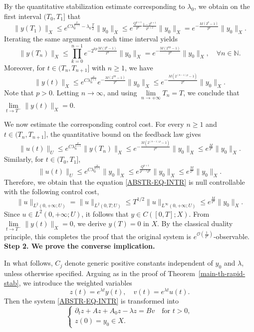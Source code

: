 \documentclass[a4paper]{article}
\numberwithin{equation}{section}
\begin{document}
By the quantitative stabilization estimate corresponding to $\lambda_0$, 
we obtain on the first interval $(T_0,T_1]$ that
$$\|y(T_1)\|_{X}\le e^{C\lambda_0^{\frac p{p+1}}-\lambda_0\frac T2}\|y_0\|_{X}\le e^{\frac{Q^{p+1}}{T^p}\frac{1-2^{p+1}}{2^{p+2}}}\|y_0\|_{X}=e^{-\frac{M(2^p-1)}{T^p}}\|y_0\|_{X}.$$
Iterating the same argument on each time interval yields
$$\|y(T_n)\|_{X}\le\prod_{k=0}^{n-1}e^{-2^{kp}\frac{M(2^p-1)}{T^p}}\|y_0\|_{X}=e^{-\frac{M(2^{np}-1)}{T^p}}\|y_0\|_{X},\quad \forall n\in\mathbb N.$$
Moreover, for $t\in (T_n,T_{n+1}]$ with $n\ge 1$, we have
$$\|y(t)\|_{X}\le e^{C\lambda_n^{\frac{p}{p+1}}}e^{-\frac{M(2^{np}-1)}{T^p}}
\|y_0\|_{X}\le e^{-\frac{M(2^{(n-1)p}-1)}{T^p}}\|y_0\|_{X}.$$
Note that $p>0$. Letting $n\to\infty$, and using $\lim\limits_{n\to+\infty}T_n=T$, we conclude that $\lim\limits_{t\to T^-}\|y(t)\|_{X}=0$.

We now estimate the corresponding control cost. For every $n\ge 1$ and $t\in(T_{n},T_{n+1}]$, the quantitative bound on the feedback law gives
$$\|u(t)\|_U\le e^{C\lambda_{n}^{\frac p{p+1}}}\|y(T_{n})\|_{X}\le e^{-\frac{M(2^{(n-1)p}-1)}{T^p}}\|y_0\|_{X}\le e^{\frac{M}{T^p}}\|y_0\|_{X}.$$
Similarly, for $t\in(T_0,T_1]$,
$$\|u(t)\|_U \le e^{C\lambda_0^{\frac p{p+1}}}\|y_0\|_{X}\le e^{\frac{Q^{p+1}}{2^{p+2}T^p}}\|y_0\|_{X}\le e^{\frac{M}{T^p}}\|y_0\|_{X}.$$
Therefore, we obtain that the equation \eqref{ABSTR-EQ-INTR} is null controllable with the following control cost,
$$\|u\|_{L^2(0,+\infty;U)}=\|u\|_{L^2(0,T;U)}\le T^{1/2}\|u\|_{L^\infty(0,+\infty;U)}\le e^{\frac{M}{T^p}}\|y_0\|_{X}.
$$ 
Since $u\in L^2(0,+\infty;U)$, it follows that $y\in C([0,T];X)$. From $\lim\limits_{t\to T^-}\|y(t)\|_{X}=0$, we derive $y(T)=0$ in $X$. By the classical duality principle, this completes the proof that the original system is $e^{\mathcal O({\frac{1}{T^p}})}$-observable.\\[-2mm]

\noindent\textbf{Step 2. We prove the converse implication.}

In what follows, $C_j$ denote generic positive constants independent of $y_0$ and $\lambda$, unless otherwise specified. Arguing as in the proof of Theorem~\ref{main-th-rapid-stab}, we introduce the weighted variables
$$z(t)=e^{\lambda t}y(t),\quad v(t)=e^{\lambda t}u(t).$$
Then the system \eqref{ABSTR-EQ-INTR} is transformed into
\begin{equation}\label{ABSTR-EQ-2}
\begin{cases}
\partial_t z+Az+A_0z-\lambda z=Bv\quad\text{for } t>0,\\[1mm]
z(0)=y_0\in X.
\end{cases}
\end{equation}
\end{document}
